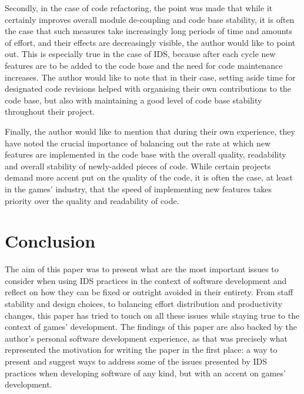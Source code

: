 \documentclass{scrartcl}
\begin{document}
    Secondly, in the case of code refactoring, the point was made that while it certainly improves overall module de-coupling and code base stability, it is often the case that such measures take increasingly long periods of time and amounts of effort, and their effects are decreasingly visible, the author would like to point out. This is especially true in the case of IDS, because after each cycle new features are to be added to the code base and the need for code maintenance increases. The author would like to note that in their case, setting aside time for designated code revisions helped with organising their own contributions to the code base, but also with maintaining a good level of code base stability throughout their project.
    
    Finally, the author would like to mention that during their own experience, they have noted the crucial importance of balancing out the rate at which new features are implemented in the code base with the overall quality, readability and overall stability of newly-added pieces of code. While certain projects demand more accent put on the quality of the code, it is often the case, at least in the games' industry, that the speed of implementing new features takes priority over the quality and readability of code.
    
    \section{Conclusion}
    
    The aim of this paper was to present what are the most important issues to consider when using IDS practices in the context of software development and reflect on how they can be fixed or outright avoided in their entirety. From staff stability and design choices, to balancing effort distribution and productivity changes, this paper has tried to touch on all these issues while staying true to the context of games' development. The findings of this paper are also backed by the author's personal software development experience, as that was precisely what represented the motivation for writing the paper in the first place: a way to present and suggest ways to address some of the issues presented by IDS practices when developing software of any kind, but with an accent on games' development.

\printbibliography
\end{document}
